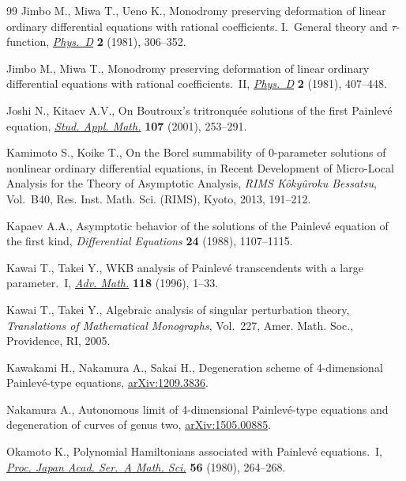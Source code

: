 \documentclass[11pt]{article}
\theoremstyle{definition}
\numberwithin{equation}{section}
\begin{document}
\begin{thebibliography}{99}
Jimbo M., Miwa T., Ueno K., Monodromy preserving deformation of linear ordinary
  dif\/ferential equations with rational coef\/f\/icients. {I}.~{G}eneral theory and
  {$\tau $}-function, \href{http://dx.doi.org/10.1016/0167-2789(81)90013-0}{\textit{Phys.~D}} \textbf{2} (1981), 306--352.

Jimbo M., Miwa T., Monodromy preserving deformation of linear ordinary
  dif\/ferential equations with rational coef\/f\/icients.~{II}, \href{http://dx.doi.org/10.1016/0167-2789(81)90021-X}{\textit{Phys.~D}}
  \textbf{2} (1981), 407--448.

Joshi N., Kitaev A.V., On {B}outroux's tritronqu\'ee solutions of the f\/irst
  {P}ainlev\'e equation, \href{http://dx.doi.org/10.1111/1467-9590.00187}{\textit{Stud. Appl. Math.}} \textbf{107} (2001),
  253--291.

Kamimoto S., Koike T., On the {B}orel summability of 0-parameter solutions of
  nonlinear ordinary dif\/ferential equations, in Recent Development of
  Micro-Local Analysis for the Theory of Asymptotic Analysis, \textit{RIMS
  K\^oky\^uroku Bessatsu}, Vol.~B40, Res. Inst. Math. Sci. (RIMS), Kyoto, 2013,
  191--212.

Kapaev A.A., Asymptotic behavior of the solutions of the {P}ainlev\'e equation
  of the f\/irst kind, \textit{Differential Equations} \textbf{24} (1988),
  1107--1115.

Kawai T., Takei Y., W{KB} analysis of {P}ainlev\'e transcendents with a large
  parameter.~{I}, \href{http://dx.doi.org/10.1006/aima.1996.0016}{\textit{Adv. Math.}} \textbf{118} (1996), 1--33.

Kawai T., Takei Y., Algebraic analysis of singular perturbation theory,
  \textit{Translations of Mathematical Monographs}, Vol.~227, Amer. Math. Soc.,
  Providence, RI, 2005.

Kawakami H., Nakamura A., Sakai H., Degeneration scheme of 4-dimensional
  Painlev\'e-type equations, \href{http://arxiv.org/abs/1209.3836}{arXiv:1209.3836}.

Nakamura A., Autonomous limit of 4-dimensional Painlev\'e-type equations and
  degeneration of curves of genus two, \href{http://arxiv.org/abs/1505.00885}{arXiv:1505.00885}.

Okamoto K., Polynomial {H}amiltonians associated with {P}ainlev\'e
  equations.~{I}, \href{http://dx.doi.org/10.3792/pjaa.56.264}{\textit{Proc. Japan Acad. Ser.~A Math. Sci.}} \textbf{56}
  (1980), 264--268.


\end{thebibliography}
\end{document}
